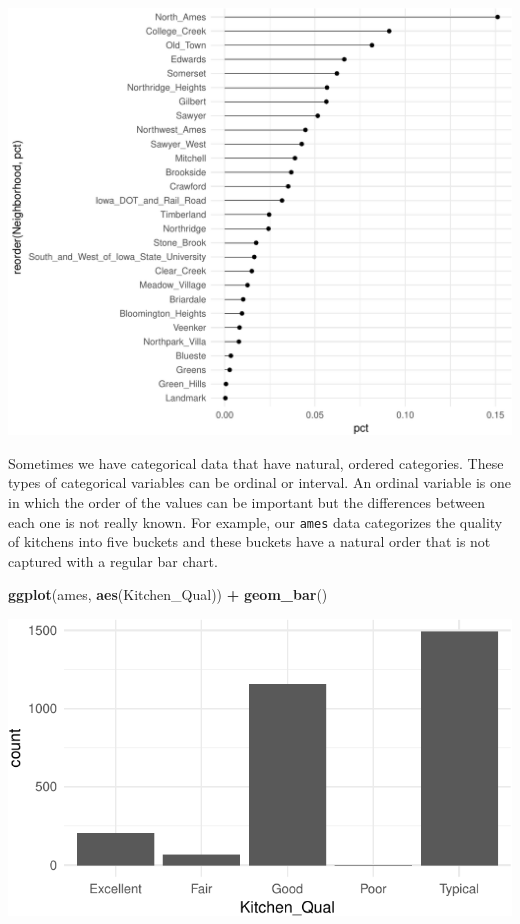 \documentclass[]{article}
\newenvironment{Shaded}{\begin{snugshade}}{\end{snugshade}}
\newcommand{\KeywordTok}[1]{\textcolor[rgb]{0.13,0.29,0.53}{\textbf{#1}}}
\newcommand{\StringTok}[1]{\textcolor[rgb]{0.31,0.60,0.02}{#1}}
\newcommand{\OperatorTok}[1]{\textcolor[rgb]{0.81,0.36,0.00}{\textbf{#1}}}
\newcommand{\NormalTok}[1]{#1}
\begin{document}
\begin{center}\includegraphics{Chapter_3_-_Visualization_files/figure-latex/dot1-1} \end{center}

Sometimes we have categorical data that have natural, ordered
categories. These types of categorical variables can be ordinal or
interval. An ordinal variable is one in which the order of the values
can be important but the differences between each one is not really
known. For example, our \texttt{ames} data categorizes the quality of
kitchens into five buckets and these buckets have a natural order that
is not captured with a regular bar chart.

\begin{Shaded}
\begin{Highlighting}[]
\KeywordTok{ggplot}\NormalTok{(ames, }\KeywordTok{aes}\NormalTok{(Kitchen_Qual)) }\OperatorTok{+}\StringTok{ }
\StringTok{  }\KeywordTok{geom_bar}\NormalTok{()}
\end{Highlighting}
\end{Shaded}

\begin{center}\includegraphics{Chapter_3_-_Visualization_files/figure-latex/ord1-1} \end{center}
\end{document}
